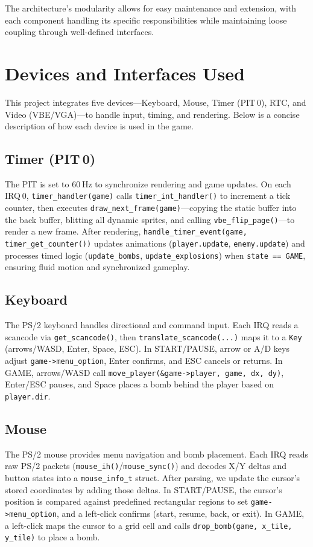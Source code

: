 \documentclass[12pt,a4paper]{article}
\begin{document}
The architecture's modularity allows for easy maintenance and extension, with each component handling its specific responsibilities while maintaining loose coupling through well-defined interfaces.

\section{Devices and Interfaces Used}
This project integrates five devices—Keyboard, Mouse, Timer (PIT 0), RTC, and Video (VBE/VGA)—to handle input, timing, and rendering. Below is a concise description of how each device is used in the game.

\subsection*{Timer (PIT 0)}
The PIT is set to 60 Hz to synchronize rendering and game updates. On each IRQ 0, \texttt{timer\_handler(game)} calls \texttt{timer\_int\_handler()} to increment a tick counter, then executes \texttt{draw\_next\_frame(game)}—copying the static buffer into the back buffer, blitting all dynamic sprites, and calling \texttt{vbe\_flip\_page()}—to render a new frame. After rendering, \texttt{handle\_timer\_event(game, timer\_get\_counter())} updates animations (\texttt{player.update}, \texttt{enemy.update}) and processes timed logic (\texttt{update\_bombs}, \texttt{update\_explosions}) when \texttt{state == GAME}, ensuring fluid motion and synchronized gameplay.

\subsection*{Keyboard}
The PS/2 keyboard handles directional and command input. Each IRQ reads a scancode via \texttt{get\_scancode()}, then \texttt{translate\_scancode(...)} maps it to a \texttt{Key} (arrows/WASD, Enter, Space, ESC). In START/PAUSE, arrow or A/D keys adjust \texttt{game->menu\_option}, Enter confirms, and ESC cancels or returns. In GAME, arrows/WASD call \texttt{move\_player(\&game->player, game, dx, dy)}, Enter/ESC pauses, and Space places a bomb behind the player based on \texttt{player.dir}.

\subsection*{Mouse}
The PS/2 mouse provides menu navigation and bomb placement. Each IRQ reads raw PS/2 packets (\texttt{mouse\_ih()}/\texttt{mouse\_sync()}) and decodes X/Y deltas and button states into a \texttt{mouse\_info\_t} struct. After parsing, we update the cursor’s stored coordinates by adding those deltas. In START/PAUSE, the cursor’s position is compared against predefined rectangular regions to set \texttt{game->menu\_option}, and a left-click confirms (start, resume, back, or exit). In GAME, a left-click maps the cursor to a grid cell and calls \texttt{drop\_bomb(game, x\_tile, y\_tile)} to place a bomb.
\end{document}
